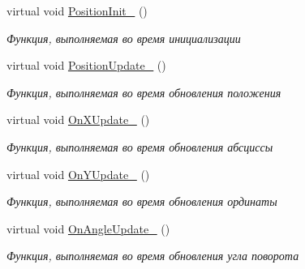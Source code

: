 \begin{DoxyCompactItemize}
virtual void \hyperlink{classrtm_1_1_world_object_a4adc266618f3aeb94ae55df76f0716dc}{Position\+Init\+\_\+} ()
\begin{DoxyCompactList}\small\item\em Функция, выполняемая во время инициализации \end{DoxyCompactList}\item 
\mbox{\label{classrtm_1_1_world_object_a1619ffa3020e1cf19c901635fd3c4b88}} 
virtual void \hyperlink{classrtm_1_1_world_object_a1619ffa3020e1cf19c901635fd3c4b88}{Position\+Update\+\_\+} ()
\begin{DoxyCompactList}\small\item\em Функция, выполняемая во время обновления положения \end{DoxyCompactList}\item 
\mbox{\label{classrtm_1_1_world_object_ac1094406fc176bd4ae14dfb3f081b7f5}} 
virtual void \hyperlink{classrtm_1_1_world_object_ac1094406fc176bd4ae14dfb3f081b7f5}{On\+X\+Update\+\_\+} ()
\begin{DoxyCompactList}\small\item\em Функция, выполняемая во время обновления абсциссы \end{DoxyCompactList}\item 
\mbox{\label{classrtm_1_1_world_object_ad6e57a1a4696307449bdd9376bfcdd75}} 
virtual void \hyperlink{classrtm_1_1_world_object_ad6e57a1a4696307449bdd9376bfcdd75}{On\+Y\+Update\+\_\+} ()
\begin{DoxyCompactList}\small\item\em Функция, выполняемая во время обновления ординаты \end{DoxyCompactList}\item 
\mbox{\label{classrtm_1_1_world_object_aeaf9640864189b88f41a4ea24ef8b5f9}} 
virtual void \hyperlink{classrtm_1_1_world_object_aeaf9640864189b88f41a4ea24ef8b5f9}{On\+Angle\+Update\+\_\+} ()
\begin{DoxyCompactList}\small\item\em Функция, выполняемая во время обновления угла поворота \end{DoxyCompactList}\item 
\mbox{\label{classrtm_1_1_world_object_acb07848ff4e36ac3b77a6c2aea2f6547}} 

\end{DoxyCompactItemize}

